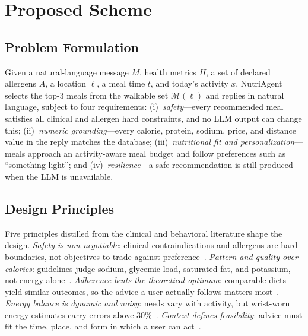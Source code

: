 \section{Proposed Scheme}
\label{sec:proposed_scheme}

\subsection{Problem Formulation}
Given a natural-language message $M$, health metrics $H$, a set of declared
allergens $A$, a location $\ell$, a meal time $t$, and today's activity $x$,
NutriAgent selects the top-3 meals from the walkable set $\mathcal{M}(\ell)$
and replies in natural language, subject to four requirements:
(i)~\emph{safety}---every recommended meal satisfies all clinical and allergen
hard constraints, and no LLM output can change this;
(ii)~\emph{numeric grounding}---every calorie, protein, sodium, price, and
distance value in the reply matches the database;
(iii)~\emph{nutritional fit and personalization}---meals approach an
activity-aware meal budget and follow preferences such as ``something light'';
and (iv)~\emph{resilience}---a safe recommendation is still produced when the
LLM is unavailable.

\subsection{Design Principles}
Five principles distilled from the clinical and behavioral literature shape the
design. \emph{Safety is non-negotiable}: clinical contraindications and
allergens are hard boundaries, not objectives to trade against
preference~\cite{mohw2018allergen,yan2025ogsrl,vasantlal2026morla2c}.
\emph{Pattern and quality over calories}: guidelines judge sodium, glycemic
load, saturated fat, and potassium, not energy
alone~\cite{jones2025hypertension,ada2026standards,kdigo2024ckd}.
\emph{Adherence beats the theoretical optimum}: comparable diets yield similar
outcomes, so the advice a user actually follows matters
most~\cite{gardner2018dietfits,thaler2008nudge}.
\emph{Energy balance is dynamic and noisy}: needs vary with activity, but
wrist-worn energy estimates carry errors above
30\%~\cite{hall2011energy,germini2022wearable,shcherbina2017wrist}.
\emph{Context defines feasibility}: advice must fit the time, place, and form in
which a user can act~\cite{lei2017actorcritic,svihrova2025bandits,lee2025pearl}.


